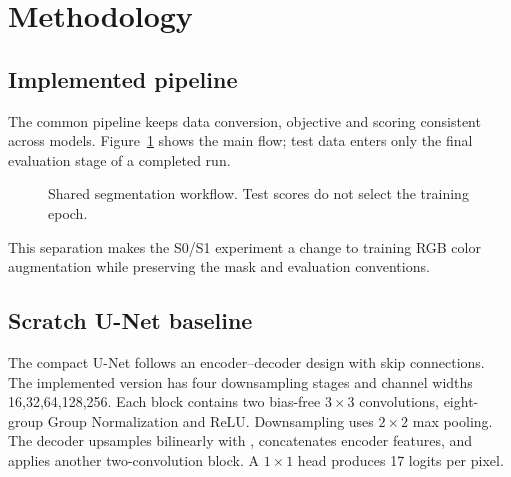 \documentclass[oneside,final,a4 paper]{hcmut-report}
\makeatletter
\newcommand{\cls}[1]{\texttt{\detokenize{#1}}}
\renewcommand\small{\@setfontsize\small{11 pt}{13.2 pt}}
\makeatother
\begin{document}
\clearpage
\section{Methodology}
\subsection{Implemented pipeline}
The common pipeline keeps data conversion, objective and scoring consistent across models. Figure~\ref{fig:pipeline} shows the main flow; test data enters only the final evaluation stage of a completed run.
\begin{figure}[H]\centering
{}
\caption{Shared segmentation workflow. Test scores do not select the training epoch.}\label{fig:pipeline}
\end{figure}
This separation makes the S0/S1 experiment a change to training RGB color augmentation while preserving the mask and evaluation conventions.

\subsection{Scratch U-Net baseline}
The compact U-Net follows an encoder--decoder design with skip connections\cite{unet}. The implemented version has four downsampling stages and channel widths 16,32,64,128,256. Each block contains two bias-free $3\times 3$ convolutions, eight-group Group Normalization and ReLU. Downsampling uses $2\times 2$ max pooling. The decoder upsamples bilinearly with \cls{align_corners=false}, concatenates encoder features, and applies another two-convolution block. A $1\times 1$ head produces 17 logits per pixel.
\end{document}
